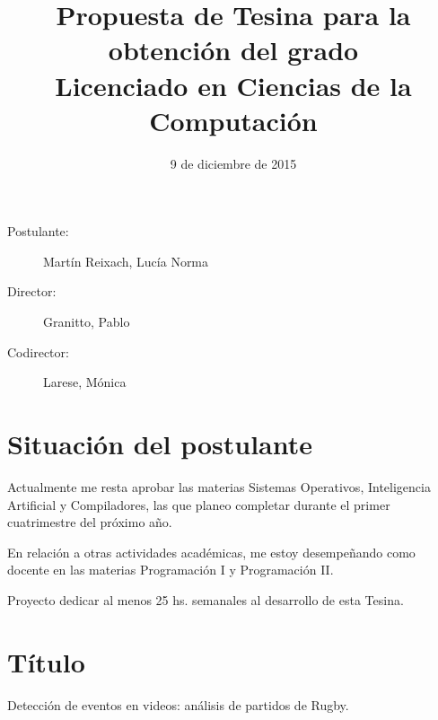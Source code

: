\documentclass[11pt]{article}
\begin{document}
\date{9 de diciembre de 2015}
\title{Propuesta de Tesina para la obtención del grado \\ Licenciado en Ciencias de la Computación}
\maketitle

\begin{description}
  \item[Postulante:] Martín Reixach, Lucía Norma
  \item[Director:] Granitto, Pablo
  \item[Codirector:] Larese, Mónica
\end{description}

\section{Situación del postulante}
Actualmente me resta aprobar las materias Sistemas Operativos, Inteligencia Artificial y Compiladores,
las que planeo completar durante el primer cuatrimestre del próximo año.

En relación a otras actividades académicas, me estoy desempeñando como docente en las materias Programación I y Programación II.

Proyecto dedicar al menos 25 hs. semanales al desarrollo de esta Tesina.

\section{Título}
Detección de eventos en videos: análisis de partidos de Rugby.






\nocite{*}

\end{document}

